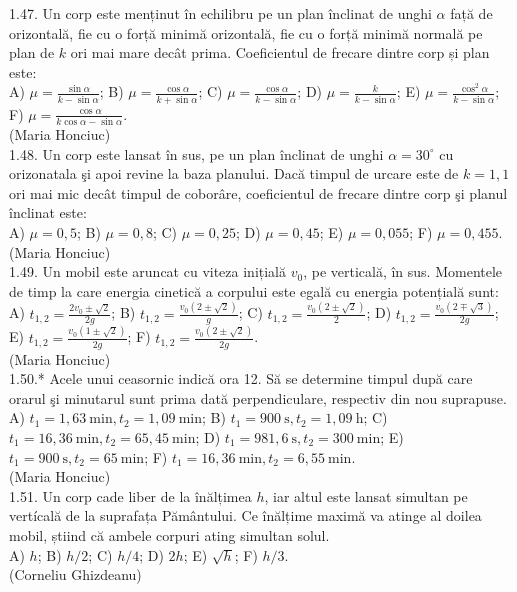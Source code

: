 1.47. Un corp este menținut în echilibru pe un plan înclinat de unghi $\alpha$ față de orizontală, fie cu o forță minimă orizontală, fie cu o forță minimă normală pe plan de $k$ ori mai mare decât prima. Coeficientul de frecare dintre corp și plan este:\\ A) $\mu=\frac{\sin \alpha}{k-\sin \alpha}$; B) $\mu=\frac{\cos \alpha}{k+\sin \alpha}$; C) $\mu=\frac{\cos \alpha}{k-\sin \alpha}$; D) $\mu=\frac{k}{k-\sin \alpha}$; E) $\mu=\frac{\cos ^{2} \alpha}{k-\sin \alpha}$; F) $\mu=\frac{\cos \alpha}{k \cos \alpha-\sin \alpha}$.\\ (Maria Honciuc)\\

1.48. Un corp este lansat în sus, pe un plan înclinat de unghi $\alpha=30^{\circ}$ cu orizonatala şi apoi revine la baza planului. Dacă timpul de urcare este de $k=1,1$ ori mai mic decât timpul de coborâre, coeficientul de frecare dintre corp şi planul înclinat este:\\ A) $\mu=0,5$; B) $\mu=0,8$; C) $\mu=0,25$; D) $\mu=0,45$; E) $\mu=0,055$; F) $\mu=0,455$.\\ (Maria Honciuc)\\

1.49. Un mobil este aruncat cu viteza inițială $v_{0}$, pe verticală, în sus. Momentele de timp la care energia cinetică a corpului este egală cu energia potențială sunt:\\ A) $t_{1,2}=\frac{2 v_{0} \pm \sqrt{2}}{2 g}$; B) $t_{1,2}=\frac{v_{0}(2 \pm \sqrt{2})}{g}$; C) $t_{1,2}=\frac{v_{0}(2 \pm \sqrt{2})}{2}$; D) $t_{1,2}=\frac{v_{0}(2 \mp \sqrt{3})}{2 g}$; E) $t_{1,2}=\frac{v_{0}(1 \pm \sqrt{2})}{2 g}$; F) $t_{1,2}=\frac{v_{0}(2 \pm \sqrt{2})}{2 g}$.\\ (Maria Honciuc)\\

1.50.* Acele unui ceasornic indică ora 12. Să se determine timpul după care orarul şi minutarul sunt prima dată perpendiculare, respectiv din nou suprapuse.\\ A) $t_{1}=1,63 \mathrm{~min}, t_{2}=1,09 \mathrm{~min}$; B) $t_{1}=900 \mathrm{~s}, t_{2}=1,09 \mathrm{~h}$; C) $t_{1}=16,36 \mathrm{~min}, t_{2}=65,45 \mathrm{~min}$; D) $t_{1}=981,6 \mathrm{~s}, t_{2}=300 \mathrm{~min}$; E) $t_{1}=900 \mathrm{~s}, t_{2}=65 \mathrm{~min}$; F) $t_{1}=16,36 \mathrm{~min}, t_{2}=6,55 \mathrm{~min}$.\\ (Maria Honciuc)\\

1.51. Un corp cade liber de la înălțimea $h$, iar altul este lansat simultan pe vertícală de la suprafața Pământului. Ce înălțime maximă va atinge al doilea mobil, știind că ambele corpuri ating simultan solul.\\ A) $h$; B) $h / 2$; C) $h / 4$; D) $2 h$; E) $\sqrt{h}$; F) $h / 3$.\\ (Corneliu Ghizdeanu)\\

